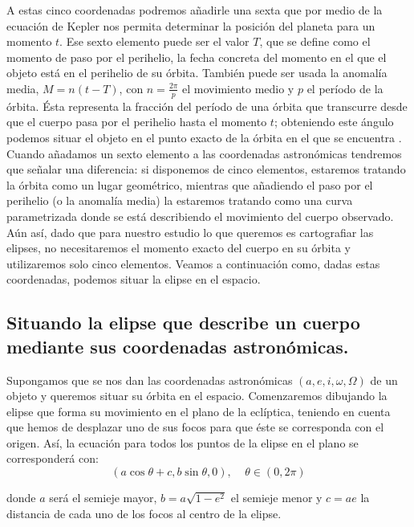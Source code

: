 A estas cinco coordenadas podremos añadirle una sexta que por medio de la ecuación de Kepler nos permita determinar la posición del planeta para un momento $t$. Ese sexto elemento puede ser el valor $T$, que se define como el momento de paso por el perihelio, la fecha concreta del momento en el que el objeto está en el perihelio de su órbita. También puede ser usada la anomalía media, $M=n(t-T)$, con $n=\frac{2\pi}{p}$ el movimiento medio y $p$ el período de la órbita. Ésta representa la fracción del período de una órbita que transcurre desde que el cuerpo pasa por el perihelio hasta el momento $t$; obteniendo este ángulo podemos situar el objeto en el punto exacto de la órbita en el que se encuentra \cite{ortega}.\\

Cuando añadamos un sexto elemento a las coordenadas astronómicas tendremos que señalar una diferencia: si disponemos de cinco elementos, estaremos tratando la órbita como un lugar geométrico, mientras que añadiendo el paso por el perihelio (o la anomalía media) la estaremos tratando como una curva parametrizada donde se está describiendo el movimiento del cuerpo observado. Aún así, dado que para nuestro estudio lo que queremos es cartografiar las elipses, no necesitaremos el momento exacto del cuerpo en su órbita y utilizaremos solo cinco elementos. Veamos a continuación como, dadas estas coordenadas, podemos situar la elipse en el espacio.\\

\subsection{Situando la elipse que describe un cuerpo mediante sus coordenadas astronómicas.}
\label{subsec:set_ellipse_position}
Supongamos que se nos dan las coordenadas astronómicas $(a,e,i,\omega,\Omega)$ de un objeto y queremos situar su órbita en el espacio. Comenzaremos dibujando la elipse que forma su movimiento en el plano de la eclíptica, teniendo en cuenta que hemos de desplazar uno de sus focos para que éste se corresponda con el origen. Así, la ecuación para todos los puntos de la elipse en el plano se corresponderá con:
\[
(a\cos{\theta}+c, b\sin{\theta}, 0), \; \; \; \; \theta\in(0,2\pi)
\]

\noindent donde $a$ será el semieje mayor, $b=a\sqrt{1-e^2}$ el semieje menor y $c=ae$ la distancia de cada uno de los focos al centro de la elipse.\\

